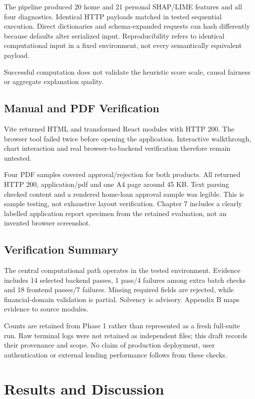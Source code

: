 \documentclass[12pt,a4paper]{report}
\begin{document}
The pipeline produced 20 home and 21 personal SHAP/LIME features and all four diagnostics. Identical HTTP payloads matched in tested sequential execution. Direct dictionaries and schema-expanded requests can hash differently because defaults alter serialized input. Reproducibility refers to identical computational input in a fixed environment, not every semantically equivalent payload.

Successful computation does not validate the heuristic score scale, causal fairness or aggregate explanation quality.

\section{Manual and PDF Verification}
Vite returned HTML and transformed React modules with HTTP 200. The browser tool failed twice before opening the application. Interactive walkthrough, chart interaction and real browser-to-backend verification therefore remain untested.

Four PDF samples covered approval/rejection for both products. All returned HTTP 200, application/pdf and one A4 page around 45 KB. Text parsing checked content and a rendered home-loan approval sample was legible. This is sample testing, not exhaustive layout verification. Chapter 7 includes a clearly labelled application report specimen from the retained evaluation, not an invented browser screenshot.

\section{Verification Summary}
The central computational path operates in the tested environment. Evidence includes 14 selected backend passes, 1 pass/4 failures among extra batch checks and 18 frontend passes/7 failures. Missing required fields are rejected, while financial-domain validation is partial. Solvency is advisory. Appendix B maps evidence to source modules.

Counts are retained from Phase 1 rather than represented as a fresh full-suite run. Raw terminal logs were not retained as independent files; this draft records their provenance and scope. No claim of production deployment, user authentication or external lending performance follows from these checks.

\chapter{Results and Discussion}
\end{document}

